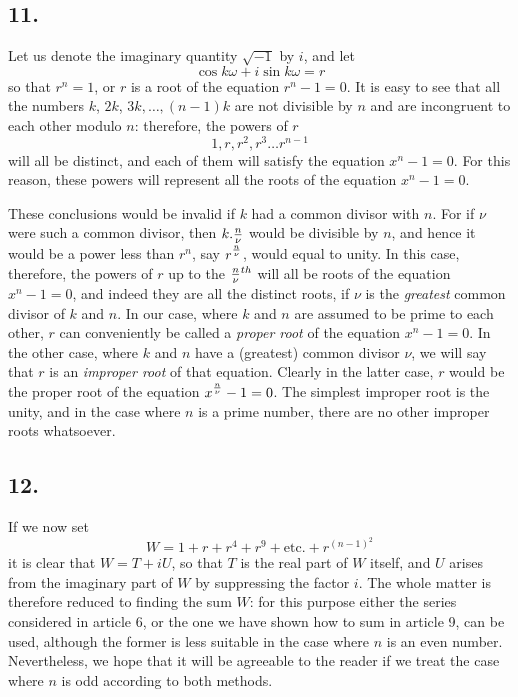 \documentclass[twoside,12pt]{memoir}
\let\oldfrac\frac
\def\frac#1#2{\mathchoice{\tfrac{#1}{#2}}{\oldfrac{#1}{#2}}{\genfrac{}{}{}{2}{#1}{#2\mathstrut}}{\genfrac{}{}{}{3}{#1}{#2\mathstrut}}}
\begin{document}
\subsection*{11.}
Let us denote the imaginary quantity \(\sqrt{-1}\) by \(i\), and let
\[\cos k \omega+i \sin k \omega=r\]
so that \(r^{n}=1\), or \(r\) is a root of the equation \(r^{n}-1=0\). It is easy to see that all the numbers \(k\), \(2 k\), \(3 k, \ldots, (n-1) k\) are not divisible by \(n\) and are incongruent to each other modulo \(n\): therefore, the powers of \(r\)
\[1, r, r^{2}, r^{3} \ldots r^{n-1}\]
will all be distinct, and each of them will satisfy the equation \(x^{n}-1=0\). For this reason, these powers will represent all the roots of the equation \(x^{n}-1=0\).
%

These conclusions would be invalid if \(k\) had a common divisor with \(n\). For if \(\nu\) were such a common divisor, then \(k . \frac{n}{\nu}\) would be divisible by \(n\), and hence it would be a power less than \(r^{n}\), say \(r^{\frac{n}{\nu}}\), would equal to unity. In this case, therefore, the powers of \(r\) up to the \(\frac{n}{\nu}^{th}\) will all be roots of the equation \(x^{n}-1=0\), and indeed they are all the distinct roots, if \(\nu\) is the \textit{greatest} common divisor of  \(k\) and \(n\). In our case, where \(k\) and \(n\) are assumed to be prime to each other, \(r\) can conveniently be called a \textit{proper root} of the equation \(x^{n}-1=0\).  In the other case, where \(k\) and \(n\) have a (greatest) common divisor \(\nu\), we will say that \(r\) is an \textit{improper root} of that equation.  Clearly in the latter case, \(r\) would be the proper root of the equation \(x^{\frac{n}{\nu}}-1=0\). The simplest improper root is the unity, and in the case where \(n\) is a prime number, there are no other improper roots whatsoever.
%

\subsection*{12.}

If we now set
\[W=1+r+r^{4}+r^{9}+\text{etc{.}}+r^{(n-1)^{2}}\]
it is clear that \(W=T+i U\), so that \(T\) is the real part of \(W\) itself, and \(U\) arises from the imaginary part of \(W\) by suppressing the factor \(i\). The whole matter is therefore reduced to finding the sum \(W\): for this purpose either the series considered in article 6, or the one we have shown how to sum in article 9, can be used, although the former is less suitable in the case where \(n\) is an even number. Nevertheless, we hope that it will be agreeable to the reader if we treat the case where \(n\) is odd according to both methods.
%
\end{document}

